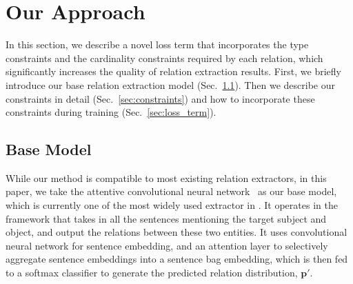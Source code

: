 \section{Our Approach}
In this section, we describe a novel loss term that incorporates the type constraints and the cardinality constraints required by each relation,
which significantly increases the quality of relation extraction results.
First, we briefly introduce our base relation extraction model (Sec.~\ref{sec:base_model}).
Then we describe our constraints in detail (Sec.~\ref{sec:constraints}) and how to incorporate these constraints during training (Sec.~\ref{sec:loss_term}).




\subsection{Base Model}
\label{sec:base_model}
While our method is compatible to most existing relation extractors, in this paper, we take the attentive convolutional neural network~\cite{lin2016neural} as our base model, which is currently one of the most widely used extractor in \RE.
It operates in the \MIL framework that takes in all the sentences mentioning the target subject and object, and output the relations between these two entities.
It uses convolutional neural network for sentence embedding, and an attention layer to selectively aggregate sentence embeddings into a sentence bag embedding, which is then fed to a softmax classifier to generate the predicted relation distribution, $\bm{p'}$. 



